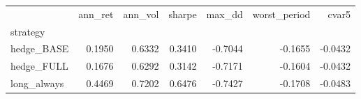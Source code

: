 \begin{tabular}{lrrrrrr}
\toprule
 & ann_ret & ann_vol & sharpe & max_dd & worst_period & cvar5 \\
strategy &  &  &  &  &  &  \\
\midrule
hedge_BASE & 0.1950 & 0.6332 & 0.3410 & -0.7044 & -0.1655 & -0.0432 \\
hedge_FULL & 0.1676 & 0.6292 & 0.3142 & -0.7171 & -0.1604 & -0.0432 \\
long_always & 0.4469 & 0.7202 & 0.6476 & -0.7427 & -0.1708 & -0.0483 \\
\bottomrule
\end{tabular}
